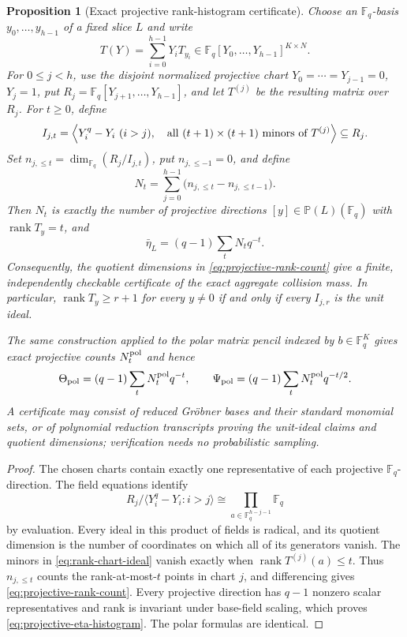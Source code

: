 \documentclass[11pt]{article}
\newtheorem{proposition}[proposition]{Proposition}
\newcommand{\F}{\mathbb F}
\newcommand{\rank}{\operatorname{rank}}
\begin{document}
\begin{proposition}[Exact projective rank-histogram certificate]
\label{prop:projective-rank-certificate}
Choose an $\F_q$-basis $y_0,\ldots,y_{h-1}$ of a fixed slice $L$ and write
\[
 T(Y)=\sum_{i=0}^{h-1}Y_iT_{y_i}\in
 \F_q[Y_0,\ldots,Y_{h-1}]^{K\times N}.
\]
For $0\le j<h$, use the disjoint normalized projective chart
$Y_0=\cdots=Y_{j-1}=0$, $Y_j=1$, put
$R_j=\F_q[Y_{j+1},\ldots,Y_{h-1}]$, and let $T^{(j)}$ be the resulting
matrix over $R_j$.  For $t\ge0$, define
\begin{equation}\label{eq:rank-chart-ideal}
 I_{j,t}=\left\langle
  Y_i^q-Y_i\ (i>j),\quad
  \textnormal{all $(t+1)\times(t+1)$ minors of }T^{(j)}
 \right\rangle\subseteq R_j.
\end{equation}
Set $n_{j,\le t}=\dim_{\F_q}(R_j/I_{j,t})$, put
$n_{j,\le-1}=0$, and define
\begin{equation}\label{eq:projective-rank-count}
 N_t=\sum_{j=0}^{h-1}
       \bigl(n_{j,\le t}-n_{j,\le t-1}\bigr).
\end{equation}
Then $N_t$ is exactly the number of projective directions $[y]\in
\mathbb P(L)(\F_q)$ with $\rank T_y=t$, and
\begin{equation}\label{eq:projective-eta-histogram}
 \bar\eta_L=(q-1)\sum_tN_tq^{-t}.
\end{equation}
Consequently, the quotient dimensions in
\eqref{eq:projective-rank-count} give a finite, independently checkable
certificate of the exact aggregate collision mass.  In particular,
$\rank T_y\ge r+1$ for every $y\ne0$ if and only if every
$I_{j,r}$ is the unit ideal.

The same construction applied to the polar matrix pencil indexed by
$b\in\F_q^K$ gives exact projective counts $N_t^{\rm pol}$ and hence
\begin{equation}\label{eq:projective-polar-histograms}
 \Theta_{\rm pol}=(q-1)\sum_tN_t^{\rm pol}q^{-t},
 \qquad
 \Psi_{\rm pol}=(q-1)\sum_tN_t^{\rm pol}q^{-t/2}.
\end{equation}
A certificate may consist of reduced Gr\"obner bases and their standard
monomial sets, or of polynomial reduction transcripts proving the unit-ideal
claims and quotient dimensions; verification needs no probabilistic sampling.
\end{proposition}

\begin{proof}
The chosen charts contain exactly one representative of each projective
$\F_q$-direction.  The field equations identify
\[
 R_j/\langle Y_i^q-Y_i:i>j\rangle
 \cong \prod_{a\in\F_q^{h-j-1}}\F_q
\]
by evaluation.  Every ideal in this product of fields is radical, and its
quotient dimension is the number of coordinates on which all of its generators
vanish.  The minors in \eqref{eq:rank-chart-ideal} vanish exactly when
$\rank T^{(j)}(a)\le t$.  Thus $n_{j,\le t}$ counts the rank-at-most-$t$
points in chart $j$, and differencing gives \eqref{eq:projective-rank-count}.
Every projective direction has $q-1$ nonzero scalar representatives and rank
is invariant under base-field scaling, which proves
\eqref{eq:projective-eta-histogram}.  The polar formulas are identical.
\end{proof}
\end{document}
